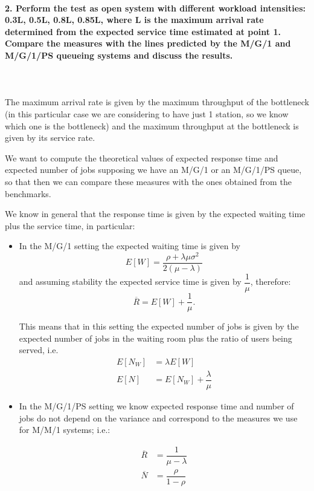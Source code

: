 \documentclass[11pt]{scrartcl} %
\begin{document}
\paragraph*{2. Perform the test as open system with different workload intensities: 0.3L, 0.5L, 0.8L, 0.85L, where L is the maximum arrival rate determined from the expected service time estimated at point 1. Compare the measures with the lines predicted by the M/G/1 and M/G/1/PS queueing systems and discuss the results.} \mbox{}\\\\

The maximum arrival rate is given by the maximum throughput of the bottleneck (in this particular case we are considering to have just 1 station, so we know which one is the bottleneck) and the maximum throughput at the bottleneck is given by its service rate.

We want to compute the theoretical values of expected response time and expected number of jobs supposing we have an M/G/1 or an M/G/1/PS queue, so that then we can compare these measures with the ones obtained from the benchmarks.

We know in general that the response time is given by the expected waiting time plus the service time, in particular:
\begin{itemize}
\item[\adforn{43}] In the M/G/1 setting the expected waiting time is given by $$E[W]=\dfrac{\rho+\lambda\mu\sigma^2}{2(\mu-\lambda)}$$ and assuming stability the expected service time is given by $\dfrac{1}{\mu}$, therefore:
$$\overline{R}=E[W]+\dfrac{1}{\mu} .$$

This means that in this setting the expected number of jobs is given by the expected number of jobs in the waiting room plus the ratio of users being served, i.e.
\begin{align*}
E[N_W] &= \lambda E[W]\\
E[N] &= E[N_W]+\dfrac{\lambda}{\mu}
\end{align*}

\item[\adforn{43}] In the M/G/1/PS setting we know expected response time and number of jobs do not depend on the variance and correspond to the measures we use for M/M/1 systems; i.e.:

\begin{align*}
\overline{R} &= \dfrac{1}{\mu-\lambda}\\
\overline{N} &= \dfrac{\rho}{1-\rho}
\end{align*}
\end{itemize}
\end{document}
